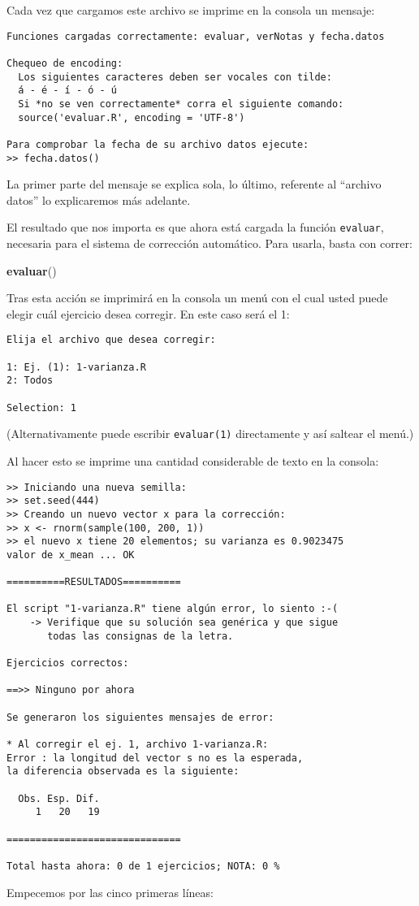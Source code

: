 \documentclass[]{article}
\newenvironment{Shaded}{}{}
\newcommand{\KeywordTok}[1]{\textcolor[rgb]{0.00,0.44,0.13}{\textbf{{#1}}}}
\newcommand{\NormalTok}[1]{{#1}}
\begin{document}
Cada vez que cargamos este archivo se imprime en la consola un mensaje:

\begin{verbatim}
Funciones cargadas correctamente: evaluar, verNotas y fecha.datos

Chequeo de encoding:
  Los siguientes caracteres deben ser vocales con tilde:
  á - é - í - ó - ú
  Si *no se ven correctamente* corra el siguiente comando:
  source('evaluar.R', encoding = 'UTF-8')

Para comprobar la fecha de su archivo datos ejecute:
>> fecha.datos()
\end{verbatim}
La primer parte del mensaje se explica sola, lo último, referente al
``archivo datos'' lo explicaremos más adelante.

El resultado que nos importa es que ahora está cargada la función
\texttt{evaluar}, necesaria para el sistema de corrección automático.
Para usarla, basta con correr:

\begin{Shaded}
\begin{Highlighting}[]
\KeywordTok{evaluar}\NormalTok{()}
\end{Highlighting}
\end{Shaded}
Tras esta acción se imprimirá en la consola un menú con el cual usted
puede elegir cuál ejercicio desea corregir. En este caso será el 1:

\begin{verbatim}
Elija el archivo que desea corregir: 

1: Ej. (1): 1-varianza.R
2: Todos

Selection: 1
\end{verbatim}
(Alternativamente puede escribir \texttt{evaluar(1)} directamente y así
saltear el menú.)

Al hacer esto se imprime una cantidad considerable de texto en la
consola:

\begin{verbatim}
>> Iniciando una nueva semilla:
>> set.seed(444)
>> Creando un nuevo vector x para la corrección:
>> x <- rnorm(sample(100, 200, 1))
>> el nuevo x tiene 20 elementos; su varianza es 0.9023475
valor de x_mean ... OK

==========RESULTADOS==========

El script "1-varianza.R" tiene algún error, lo siento :-(
    -> Verifique que su solución sea genérica y que sigue
       todas las consignas de la letra. 

Ejercicios correctos:

==>> Ninguno por ahora

Se generaron los siguientes mensajes de error:

* Al corregir el ej. 1, archivo 1-varianza.R:
Error : la longitud del vector s no es la esperada,
la diferencia observada es la siguiente:

  Obs. Esp. Dif. 
     1   20   19 

==============================

Total hasta ahora: 0 de 1 ejercicios; NOTA: 0 % 
\end{verbatim}
Empecemos por las cinco primeras líneas:
\end{document}
